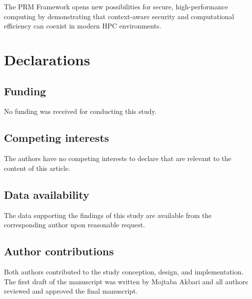 \documentclass[]{sn-jnl}
\begin{document}
The PRM Framework opens new possibilities for secure, high-performance computing
by demonstrating that context-aware security and computational efficiency can
coexist in modern HPC environments.

\section*{Declarations}

\subsection*{Funding}
No funding was received for conducting this study.

\subsection*{Competing interests}
The authors have no competing interests to declare that are relevant to the
content of this article.

\subsection*{Data availability}
The data supporting the findings of this study are available from the corresponding
author upon reasonable request.

\subsection*{Author contributions}
Both authors contributed to the study conception, design, and implementation.
The first draft of the manuscript was written by Mojtaba Akbari and all authors
reviewed and approved the final manuscript.
\end{document}
